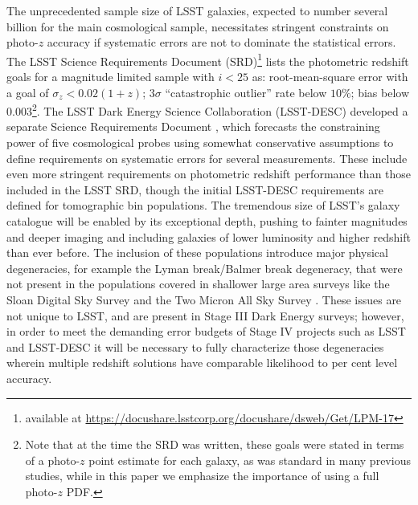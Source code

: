 The unprecedented sample size of LSST galaxies, expected to number several billion for the main cosmological sample, necessitates stringent constraints on photo-$z$ accuracy if systematic errors are not to dominate the statistical errors.
The LSST Science Requirements Document (SRD)\footnote{available at \url{https://docushare.lsstcorp.org/docushare/dsweb/Get/LPM-17}} lists the photometric redshift goals for a magnitude limited sample with $i<25$ as: root-mean-square error with a goal of $\sigma_z<0.02(1+z)$; $3\sigma$ ``catastrophic outlier'' rate below $10\%$; bias below $0.003$\footnote{
Note that at the time the SRD was written, these goals were stated in terms of a photo-$z$ point estimate for each galaxy, as was standard in many previous studies, while in this paper we emphasize the importance of using a full photo-$z$ PDF.}.  The LSST Dark Energy Science Collaboration (LSST-DESC) developed a separate Science Requirements Document \citep{Mandelbaum:2018}, which forecasts the constraining power of five cosmological probes using somewhat conservative assumptions to define requirements on systematic errors for several measurements.  These include even more stringent requirements on photometric redshift performance than those included in the LSST SRD, though the initial LSST-DESC requirements are defined for tomographic bin populations.  The tremendous size of LSST's galaxy catalogue will be enabled by its exceptional depth, pushing to fainter magnitudes and deeper imaging and including galaxies of lower luminosity and higher redshift than ever before.
The inclusion of these populations introduce major physical degeneracies, for example the Lyman break/Balmer break degeneracy, that were not present in the populations covered in shallower large area surveys like the Sloan Digital Sky Survey \citep[SDSS,][]{York:00} and the Two Micron All Sky Survey \citep[2MASS,][]{Skrutskie:06}.  These issues are not unique to LSST, and are present in Stage III Dark Energy surveys; however,
in order to meet the demanding error budgets of Stage IV projects such as LSST and LSST-DESC it will be necessary to fully characterize those degeneracies wherein multiple redshift solutions have comparable likelihood to per cent level accuracy.

